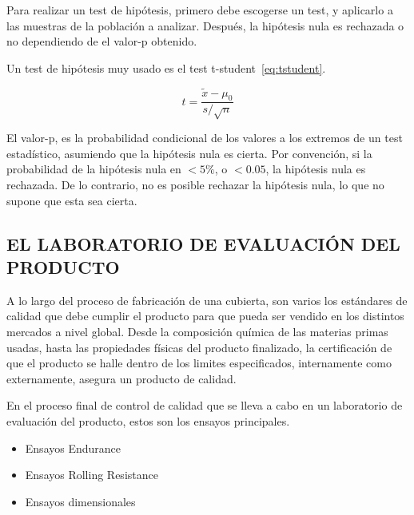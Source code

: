 Para realizar un test de hipótesis, primero debe escogerse un test, y aplicarlo a las muestras de la población a analizar. Después, la hipótesis nula es rechazada o no dependiendo de el valor-p obtenido.

Un test de hipótesis muy usado es el test t-student~\ref{eq:tstudent}.

\begin{equation}
	t = \frac{\tilde{x} - \mu_0}{s / \sqrt{n}}
	\label{eq:tstudent}
\end{equation}

El valor-p, es la probabilidad condicional de los valores a los extremos de un test estadístico, asumiendo que la hipótesis nula es cierta. Por convención, si la probabilidad de la hipótesis nula en $<5\%$, o $<0.05$, la hipótesis nula es rechazada. De lo contrario, no es posible rechazar la hipótesis nula, lo que no supone que esta sea cierta.

\subsection{EL LABORATORIO DE EVALUACIÓN DEL \newline PRODUCTO}

A lo largo del proceso de fabricación de una cubierta,
son varios los estándares de calidad que debe cumplir el producto
para que pueda ser vendido en los distintos mercados a nivel global.
Desde la composición química de las materias primas usadas,
hasta las propiedades físicas del producto finalizado,
la certificación de que el producto se halle dentro de los limites especificados,
internamente como externamente, asegura un producto de calidad.

En el proceso final de control de calidad
que se lleva a cabo en un laboratorio de evaluación del producto,
estos son los ensayos principales.

\begin{itemize}
	\item Ensayos Endurance
	\item Ensayos Rolling Resistance
	\item Ensayos dimensionales
\end{itemize}

